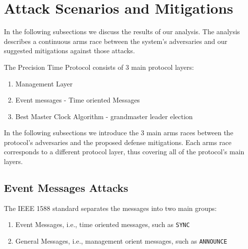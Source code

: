 \documentclass[11pt]{article}
\begin{document}
\section{Attack Scenarios and Mitigations}\label{Attack Scenarios}



In the following subsections we discuss the results of our analysis. The analysis describes a continuous arms race between the system's adversaries and our suggested mitigations against those attacks.



The Precision Time Protocol consists of 3 main protocol layers:

\begin{enumerate}

  \item Management Layer

  \item Event messages - Time oriented Messages

  \item Best Master Clock Algorithm - grandmaster leader election

\end{enumerate}



In the following subsections we introduce the 3 main arms races between the protocol's adversaries and the proposed defense mitigations. Each arms race corresponds to a different protocol layer, thus covering all of the protocol's main layers.





\subsection{Event Messages Attacks}\label{attack:time}



The IEEE 1588 standard separates the messages into two main groups:

\begin{enumerate}

  \item Event Messages, i.e., time oriented messages, such as \texttt{SYNC}

  \item General Messages, i.e., management orient messages, such as \texttt{ANNOUNCE}

\end{enumerate}
\end{document}
